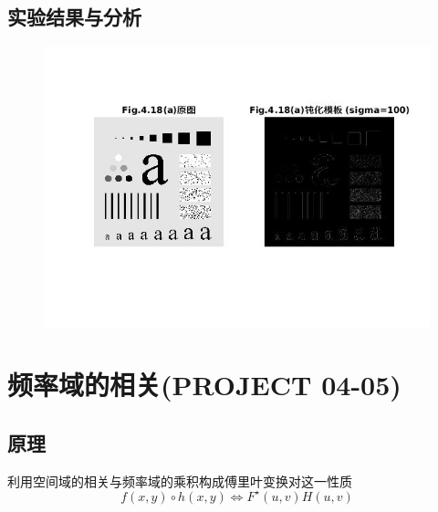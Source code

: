 \documentclass[logo,reportComp]{thesis}
\begin{document}
\subsection{实验结果与分析}
\begin{figure}[H]
\centering
\includegraphics[width=\linewidth]{fig/04.jpg}
\end{figure}

\section{频率域的相关(PROJECT 04-05)}
\subsection{原理}
利用空间域的相关与频率域的乘积构成傅里叶变换对这一性质
\[f(x,y)\circ h(x,y)\iff F^\star(u,v)H(u,v)\]
\end{document}
